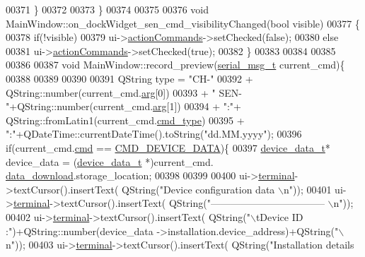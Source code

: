 \begin{DoxyCode}
00371     \}
00372 
00373 \}
00374 
00375 
00376 \textcolor{keywordtype}{void} MainWindow::on\_dockWidget\_sen\_cmd\_visibilityChanged(\textcolor{keywordtype}{bool} visible)
00377 \{
00378     \textcolor{keywordflow}{if}(!visible)
00379         ui->\hyperlink{a00080_a3dccdc21d3df68b86550093b5e3c0356}{actionCommands}->setChecked(\textcolor{keyword}{false});
00380     \textcolor{keywordflow}{else}
00381        ui->\hyperlink{a00080_a3dccdc21d3df68b86550093b5e3c0356}{actionCommands}->setChecked(\textcolor{keyword}{true});
00382 \}
00383 
00384 
00385 
00386 
00387 \textcolor{keywordtype}{void} MainWindow::record\_preview(\hyperlink{a00004_d3/dd5/a00215}{serial\_msg\_t} current\_cmd)\{
00388     
00389     
00390 
00391     QString type = \textcolor{stringliteral}{"CH-"}
00392                    + QString::number(current\_cmd.\hyperlink{a00004_a56e6c2d7315d0ae60a51e8b140c9cfe4}{arg}[0])
00393                    + \textcolor{stringliteral}{" SEN-"}+QString::number(current\_cmd.\hyperlink{a00004_a56e6c2d7315d0ae60a51e8b140c9cfe4}{arg}[1])
00394                    + \textcolor{stringliteral}{":"}+ QString::fromLatin1(current\_cmd.\hyperlink{a00004_a217dc0db956d3bb46d8573960cb7359a}{cmd\_type})
00395                    + \textcolor{stringliteral}{":"}+QDateTime::currentDateTime().toString(\textcolor{stringliteral}{"dd.MM.yyyy"});
00396     \textcolor{keywordflow}{if}(current\_cmd.\hyperlink{a00004_af20664dc9ca2b752c73d524edee0e07a}{cmd} == \hyperlink{a00086_a4412fcb90fb9171d432a624428881e70}{CMD\_DEVICE\_DATA})\{
00397        \hyperlink{a00006_a95029dff9c90f6a6907353ba86eb3f33}{device\_data\_t}* device\_data = (\hyperlink{a00006_a95029dff9c90f6a6907353ba86eb3f33}{device\_data\_t} *)current\_cmd.
      \hyperlink{a00004_a5cfeaed4d4f8e51070a324c0ba893ebe}{data\_download}.storage\_location;
00398 
00399 
00400        ui->\hyperlink{a00080_aae71c46ea4546df5994735dee573b2dd}{terminal}->textCursor().insertText( QString(\textcolor{stringliteral}{"Device configuration data \(\backslash\)n"}));
00401        ui->\hyperlink{a00080_aae71c46ea4546df5994735dee573b2dd}{terminal}->textCursor().insertText( QString(\textcolor{stringliteral}{"----------------------------------- \(\backslash\)n"}));
00402        ui->\hyperlink{a00080_aae71c46ea4546df5994735dee573b2dd}{terminal}->textCursor().insertText( QString(\textcolor{stringliteral}{"\(\backslash\)tDevice ID :"})+QString::number(device\_data
      ->installation.device\_address)+QString(\textcolor{stringliteral}{"\(\backslash\)n"}));
00403        ui->\hyperlink{a00080_aae71c46ea4546df5994735dee573b2dd}{terminal}->textCursor().insertText( QString(\textcolor{stringliteral}{"Installation details
}
\end{DoxyCode}

